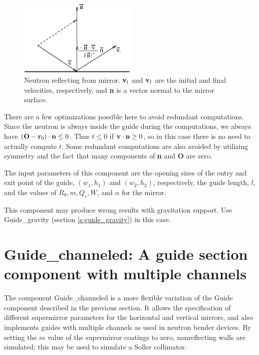 \begin{figure}
  \begin{center}
    \includegraphics[width=0.5\textwidth]{figures/guide2.eps}
  \end{center}
\caption{Neutron reflecting from mirror. ${\bf v}_{\rm i}$ and
${\bf v}_{\rm f}$ are the initial and final velocities, respectively,
and {\bf n} is a vector normal to the mirror surface.}
\label{f:guidereflect}
\end{figure}

There are a few optimizations possible here to avoid redundant
computations. Since the neutron is always inside the guide during the
computations, we always have
$({\bf O} - {\bf r}_0) \cdot {\bf n} \leq 0$.
Thus $t \leq 0$ if ${\bf v} \cdot {\bf n} \geq 0$, so in this case
there is no need to actually compute $t$. Some redundant computations
are also avoided by utilizing symmetry and the fact that many
components of {\bf n} and {\bf O} are zero.

The input parameters of this component are
the opening sizes of the entry and exit point of the
guide, $(w_1, h_1)$ and $(w_2, h_2)$, respectively,
the guide length, $l$,
and the values of $R_0, m, Q_c, W$, and $\alpha$ for the mirror.

This component may produce wrong results with gravitation support. Use Guide\_gravity (section \ref{s:guide_gravity}) in this case.


\section{Guide\_channeled: A guide section component with multiple channels}
\label{s:channeled_guide}


The component Guide\_channeled is a more flexible variation of the Guide
component described in the previous section. It allows the specification
of different supermirror parameters for the horizontal and vertical
mirrors, and also implements guides with multiple channels as used in
neutron bender devices. By setting the $m$ value of the supermirror
coatings to zero, nonreflecting walls are
simulated; this may be used to simulate a Soller collimator.

